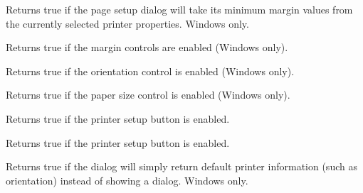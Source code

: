 \label{wxpagesetupdialogdatagetdefaultminmargins}


Returns true if the page setup dialog will take its minimum margin values from the currently
selected printer properties. Windows only.

\label{wxpagesetupdialogdatagetenablemargins}


Returns true if the margin controls are enabled (Windows only).

\label{wxpagesetupdialogdatagetenableorientation}


Returns true if the orientation control is enabled (Windows only).

\label{wxpagesetupdialogdatagetenablepaper}


Returns true if the paper size control is enabled (Windows only).

\label{wxpagesetupdialogdatagetenableprinter}


Returns true if the printer setup button is enabled.

\label{wxpagesetupdialogdatagetenablehelp}


Returns true if the printer setup button is enabled.

\label{wxpagesetupdialogdatagetdefaultinfo}


Returns true if the dialog will simply return default printer information (such as orientation)
instead of showing a dialog. Windows only.

\label{wxpagesetupdialogdatagetmargintopleft}


